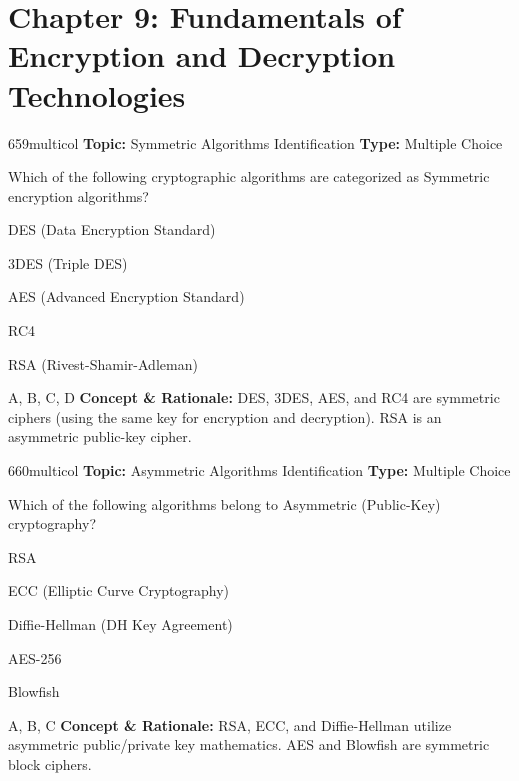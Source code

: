 \section{Chapter 9: Fundamentals of Encryption and Decryption Technologies}

\begin{qcard}{659}{multicol}
\textcolor{darkslate!75}{\small\textbf{Topic:} Symmetric Algorithms Identification \hfill \textbf{Type:} Multiple Choice}\vspace{0.4em}\par
Which of the following cryptographic algorithms are categorized as Symmetric encryption algorithms?
\begin{qoptions}
\item DES (Data Encryption Standard)
\item 3DES (Triple DES)
\item AES (Advanced Encryption Standard)
\item RC4
\item RSA (Rivest-Shamir-Adleman)
\end{qoptions}
\end{qcard}
\nopagebreak
\begin{explainbox}{A, B, C, D}
\textbf{Concept \& Rationale:} DES, 3DES, AES, and RC4 are symmetric ciphers (using the same key for encryption and decryption). RSA is an asymmetric public-key cipher.
\end{explainbox}

\begin{qcard}{660}{multicol}
\textcolor{darkslate!75}{\small\textbf{Topic:} Asymmetric Algorithms Identification \hfill \textbf{Type:} Multiple Choice}\vspace{0.4em}\par
Which of the following algorithms belong to Asymmetric (Public-Key) cryptography?
\begin{qoptions}
\item RSA
\item ECC (Elliptic Curve Cryptography)
\item Diffie-Hellman (DH Key Agreement)
\item AES-256
\item Blowfish
\end{qoptions}
\end{qcard}
\nopagebreak
\begin{explainbox}{A, B, C}
\textbf{Concept \& Rationale:} RSA, ECC, and Diffie-Hellman utilize asymmetric public/private key mathematics. AES and Blowfish are symmetric block ciphers.
\end{explainbox}

